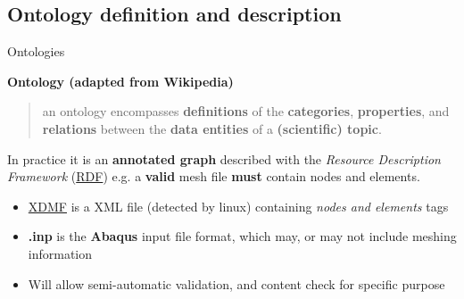 \documentclass[10pt,compress,serif,aspectratio=169]{beamer}
\begin{document}
\subsection{Ontology definition and description}
\begin{frame}[t]{Ontologies}

    \textbf{Ontology (adapted from Wikipedia)}
\begin{quote}
an ontology encompasses \textbf{definitions} of the \textbf{categories}, \textbf{properties}, and \textbf{relations} between the \textbf{data entities} of a \textbf{(scientific) topic}.
  \end{quote}
\pause
\vfill
\begin{minipage}{.4\textwidth}
In practice it is an \textbf{annotated graph} described with the \textit{Resource Description Framework}  (\href{https://www.techtarget.com/searchapparchitecture/definition/Resource-Description-Framework-RDF}{RDF})\newline
\pause
\vfill
e.g. a {\huge \textbf{valid}} mesh file {\huge\textbf{must}} contain nodes and elements. 
\end{minipage}
\begin{minipage}{.56\textwidth}
\begin{center}
\end{center}
\end{minipage}

\vfill
\pause
\begin{itemize}
  \item \href{https://www.xdmf.org/index.php/XDMF_Model_and_Format}{XDMF} is a XML file (detected by linux) containing \textit{nodes and elements} tags
  \item \textbf{.inp} is the \textbf{Abaqus} input file format, which may, or may not include meshing information
\pause
  \item \alert{Will allow semi-automatic validation, and content check for specific purpose}
\end{itemize}
\vfill
  \end{frame}


%     
\end{document}
